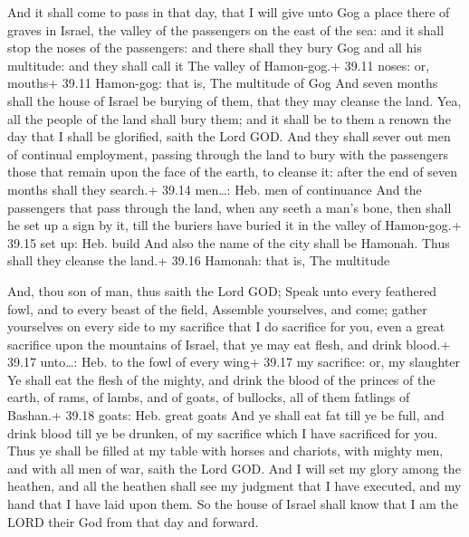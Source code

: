  And it shall come to pass in that day, that I will give
unto Gog a place there of graves in Israel, the valley of the passengers
on the east of the sea: and it shall stop the noses of the passengers:
and there shall they bury Gog and all his multitude: and they shall call
it The valley of Hamon-gog.+ 39.11 noses: or, mouths+ 39.11 Hamon-gog:
that is, The multitude of Gog  And seven months shall the
house of Israel be burying of them, that they may cleanse the land.
 Yea, all the people of the land shall bury them; and it
shall be to them a renown the day that I shall be glorified, saith the
Lord GOD.  And they shall sever out men of continual
employment, passing through the land to bury with the passengers those
that remain upon the face of the earth, to cleanse it: after the end of
seven months shall they search.+ 39.14 men\ldots: Heb. men of
continuance  And the passengers that pass through the land,
when any seeth a man's bone, then shall he set up a sign by it, till the
buriers have buried it in the valley of Hamon-gog.+ 39.15 set up: Heb.
build  And also the name of the city shall be Hamonah. Thus
shall they cleanse the land.+ 39.16 Hamonah: that is, The multitude

 And, thou son of man, thus saith the Lord GOD; Speak
unto every feathered fowl, and to every beast of the field, Assemble
yourselves, and come; gather yourselves on every side to my sacrifice
that I do sacrifice for you, even a great sacrifice upon the mountains
of Israel, that ye may eat flesh, and drink blood.+ 39.17 unto\ldots:
Heb. to the fowl of every wing+ 39.17 my sacrifice: or, my slaughter
 Ye shall eat the flesh of the mighty, and drink the blood
of the princes of the earth, of rams, of lambs, and of goats, of
bullocks, all of them fatlings of Bashan.+ 39.18 goats: Heb. great goats
 And ye shall eat fat till ye be full, and drink blood till
ye be drunken, of my sacrifice which I have sacrificed for you.
 Thus ye shall be filled at my table with horses and
chariots, with mighty men, and with all men of war, saith the Lord GOD.
 And I will set my glory among the heathen, and all the
heathen shall see my judgment that I have executed, and my hand that I
have laid upon them.  So the house of Israel shall know
that I am the LORD their God from that day and forward.

